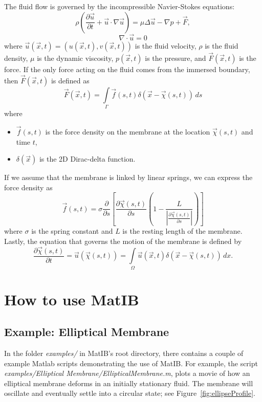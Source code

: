 \documentclass{article}
\newcommand{\abs}[1]{\left\vert#1\right\vert}
\newcommand{\bq}{\begin{equation}}
\newcommand{\eq}{\end{equation}}
\newcommand{\softwarename}{MatIB}
\begin{document}
The fluid flow is governed by the incompressible Navier-Stokes equations:
\bq\label{eq:NSE}
\rho\left(\frac{\partial\vec{u}}{\partial t} + \vec{u}\cdot\nabla\vec{u}\right) = \mu \Delta \vec{u} - \nabla p + \vec{F},
\eq
\bq\label{eq:incompressible}
\nabla \cdot \vec{u} = 0
\eq
where $\vec{u}(\vec{x},t)=(u(\vec{x},t),v(\vec{x},t))$ is the fluid velocity, $\rho$ is the fluid density, $\mu$ is the dynamic viscosity, 
$p(\vec{x},t)$ is the pressure, and $\vec{F}(\vec{x},t)$ is the force. If the only force acting on the fluid comes from the immersed boundary, 
then $\vec{F}(\vec{x},t)$ is defined as 
\bq\label{eq:force}
\vec{F}(\vec{x},t) = \int\limits_\Gamma \vec{f}(s,t) \delta(\vec{x} - \vec{\chi}(s,t))\,ds
\eq
where
\begin{itemize}
\item $\vec{f}(s,t)$ is the force density on the membrane at the location $\vec{\chi}(s,t)$ and time $t$,
\item $\delta(\vec{x})$ is the 2D Dirac-delta function.
\end{itemize}
If we assume that the membrane is linked by linear springs, we can express the force density as
\bq\label{eq:forceDensity}
\vec{f}(s,t) = \sigma \frac{\partial}{\partial s}\left[\frac{\partial\vec{\chi}(s,t)}{\partial s}\left(1 - \frac{L}{\abs{\frac{\partial \vec{\chi}(s,t)}{\partial s}}}\right)\right]
\eq
where $\sigma$ is the spring constant and $L$ is the resting length of the membrane.
Lastly, the equation that governs the motion of the membrane is defined by 
\bq\label{eq:membrane}
\frac{\partial\vec{\chi}(s,t)}{\partial t} = \vec{u}(\vec{\chi}(s,t)) = \int\limits_\Omega \vec{u}(\vec{x},t)\delta(\vec{x}-\vec{\chi}(s,t))\,dx.
\eq

\section{How to use \softwarename}\label{sec:HowTo}

\subsection{Example: Elliptical Membrane}\label{sec:EllipticalMembrane}

In the folder \emph{examples/} in \softwarename's root directory, there contains a couple of example Matlab scripts demonstrating the use of \softwarename.
For example, the script \emph{examples/Elliptical Membrane/EllipticalMembrane.m}, plots a movie of how an elliptical membrane deforms in an initially 
stationary fluid. The membrane will oscillate and eventually settle into a circular state; see Figure~\ref{fig:ellipseProfile}.
\end{document}
